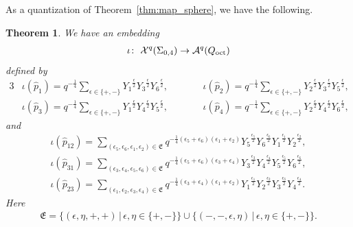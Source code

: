 \documentclass[pdftex]{sigma}
\numberwithin{equation}{section}
\newtheorem{Theorem}{Theorem}[section]
\begin{document}
As a quantization of Theorem~\ref{thm:map_sphere}, we have the following.
\begin{Theorem} \label{thm:qW_for_sphere} We have an embedding
 \begin{gather*}
 \iota\colon \ \mathcal{X}^q(\Sigma_{0,4}) \to \mathcal{A}^q(Q_{\text{\rm oct}})
 \end{gather*}
 defined by
 \begin{alignat}{3}
& \iota(\hat{p}_1) = q^{-\frac{1}{4}} \sum_{\epsilon\in \{+,-\} } {Y_1}^{\frac{\epsilon}{2}} {Y_3}^{\frac{\epsilon}{2}} {Y_6}^{\frac{\epsilon}{2}} ,\qquad
 & &\iota(\hat{p}_2) = q^{-\frac{1}{4}} \sum_{\epsilon\in \{+,-\} } {Y_2}^{\frac{\epsilon}{2}} {Y_3}^{\frac{\epsilon}{2}} {Y_5}^{\frac{\epsilon}{2}} , & \nonumber\\
 & \iota(\hat{p}_3) = q^{-\frac{1}{4}} \sum_{\epsilon\in \{+,-\} } {Y_1}^{\frac{\epsilon}{2}} {Y_4}^{\frac{\epsilon}{2}} {Y_5}^{\frac{\epsilon}{2}} ,\qquad & &
 \iota(\hat{p}_4) = q^{-\frac{1}{4}} \sum_{\epsilon\in \{+,-\} } {Y_2}^{\frac{\epsilon}{2}} {Y_4}^{\frac{\epsilon}{2}} {Y_6}^{\frac{\epsilon}{2}} ,&\label{qp_YYY}
 \end{alignat}
 and
\begin{gather*}
\iota(\hat{p}_{12}) = \sum_{ ( \epsilon_5, \epsilon_6,\epsilon_1, \epsilon_2) \in \mathfrak{E} } q^{-\frac{1}{4} (\epsilon_5+\epsilon_6) (\epsilon_1+\epsilon_2) } {Y_5}^{\frac{\epsilon_5}{2}}
 {Y_6}^{\frac{\epsilon_6}{2}} {Y_1}^{\frac{\epsilon_1}{2}} {Y_2}^{\frac{\epsilon_2}{2}} , \\
 \iota( \hat{p}_{31} ) = \sum_{ (\epsilon_3, \epsilon_4, \epsilon_5, \epsilon_6) \in \mathfrak{E} } q^{-\frac{1}{4} (\epsilon_5+\epsilon_6) (\epsilon_3+\epsilon_4) }
 {Y_3}^{\frac{\epsilon_3}{2}} {Y_4}^{\frac{\epsilon_4}{2}} {Y_5}^{\frac{\epsilon_5}{2}} {Y_6}^{\frac{\epsilon_6}{2}} , \\
 \iota(\hat{p}_{23}) = \sum_{ (\epsilon_1, \epsilon_2, \epsilon_3, \epsilon_4) \in \mathfrak{E} } q^{-\frac{1}{4} (\epsilon_3+\epsilon_4) (\epsilon_1+\epsilon_2) } {Y_1}^{\frac{\epsilon_1}{2}}
 {Y_2}^{\frac{\epsilon_2}{2}} {Y_3}^{\frac{\epsilon_3}{2}} {Y_4}^{\frac{\epsilon_4}{2}} .
\end{gather*}
Here
\begin{gather*}
 \mathfrak{E} = \{ ( \epsilon, \eta, +, + ) \,|\, \epsilon , \eta \in \{+, - \} \} \cup \{ ( -, -, \epsilon, \eta ) \,|\, \epsilon , \eta \in \{+, - \}\} .
\end{gather*}
\end{Theorem}
\end{document}

